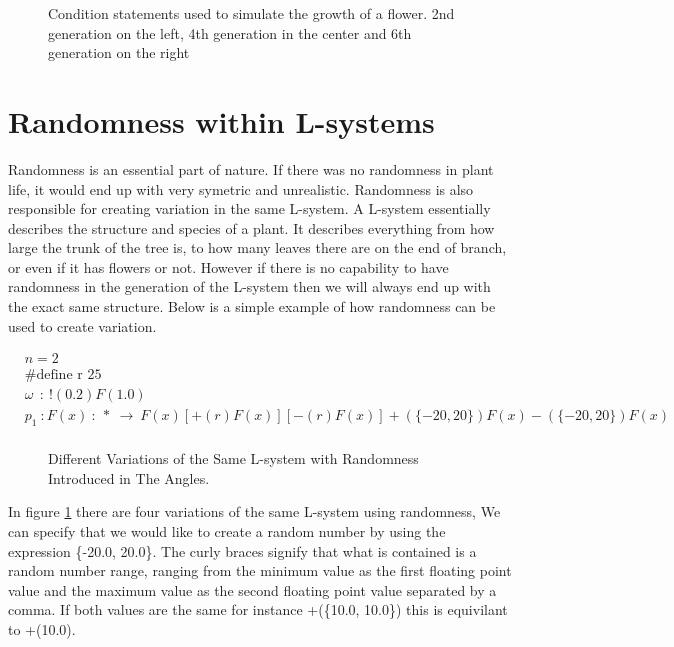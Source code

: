 \begin{figure}[htbp]
	{\centering
		\vspace{7px}
		\setlength{\fboxrule}{1pt}
		\caption{Condition statements used to simulate the growth of a flower. 2nd generation on the left, 4th generation in the center and 6th generation on the right}
	}
\end{figure}
\FloatBarrier


\section{Randomness within L-systems} \label{Randomness L-system Subsection}

Randomness is an essential part of nature. If there was no randomness in plant life, it would end up with very symetric and unrealistic. Randomness is also responsible for creating variation in the same L-system. A L-system essentially describes the structure and species of a plant. It describes everything from how large the trunk of the tree is, to how many leaves there are on the end of branch, or even if it has flowers or not. However if there is no capability to have randomness in the generation of the L-system then we will always end up with the exact same structure. 
\vspace{5mm}
Below is a simple example of how randomness can be used to create variation.

\begin{equation} \label{randomness example}
\begin{aligned}
	&n=2\\
	&\text{\#define r 25} \\
	&\omega~~ :~ !(0.2)F(1.0)\\
	&p_1~ :  F(x)~ :~ *~ \rightarrow~ F(x)[+(r)F(x)][-(r)F(x)]+(\{-20, 20\})F(x)-(\{-20, 20\})F(x)\\
\end{aligned}
\end{equation}

\begin{figure}[htbp]

	{\centering
		\setlength{\fboxrule}{0pt}
		\caption{Different Variations of the Same L-system with Randomness Introduced in The Angles. \label{figRandomness}}
	}
\end{figure}
\FloatBarrier

\noindent
In figure \ref{figRandomness} there are four variations of the same L-system using randomness, We can specify that we would like to create a random number by using the expression \{-20.0, 20.0\}. The curly braces signify that what is contained is a random number range, ranging from the minimum value as the first floating point value and the maximum value as the second floating point value separated by a comma. If both values are the same for instance +(\{10.0, 10.0\}) this is equivilant to +(10.0).

